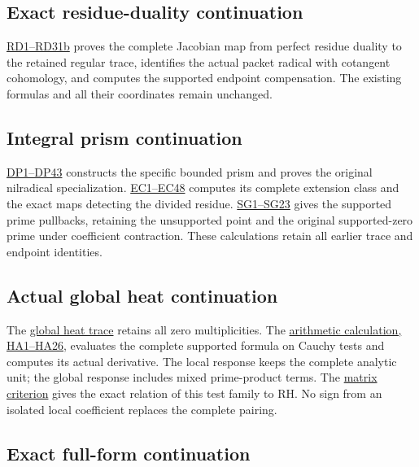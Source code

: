 \documentclass[
  10pt,
  a4paper,
]{article}
\begin{document}
\subsection{Exact residue-duality
continuation}\label{exact-residue-duality-continuation}

\href{COLLISION_RESIDUE_DUALITY_DERIVATION.md}{RD1--RD31b} proves the
complete Jacobian map from perfect residue duality to the retained
regular trace, identifies the actual packet radical with cotangent
cohomology, and computes the supported endpoint compensation. The
existing formulas and all their coordinates remain unchanged.

\subsection{Integral prism
continuation}\label{integral-prism-continuation}

\href{DISTINGUISHED_COLLISION_PRISM_DERIVATION.md}{DP1--DP43} constructs
the specific bounded prism and proves the original nilradical
specialization.
\href{NILRADICAL_COTANGENT_EXTENSION_CLASS_DERIVATION.md}{EC1--EC48}
computes its complete extension class and the exact maps detecting the
divided residue.
\href{SUPPORTED_PRISM_SPECTRUM_DERIVATION.md}{SG1--SG23} gives the
supported prime pullbacks, retaining the unsupported point and the
original supported-zero prime under coefficient contraction. These
calculations retain all earlier trace and endpoint identities.

\subsection{Actual global heat
continuation}\label{actual-global-heat-continuation}

The \href{ACTUAL_HEAT_ZERO_DISTRIBUTION_VARIATION.md}{global heat trace}
retains all zero multiplicities. The
\href{HEAT_CAUCHY_ARITHMETIC_DERIVATION.md}{arithmetic calculation,
HA1--HA26}, evaluates the complete supported formula on Cauchy tests and
computes its actual derivative. The local response keeps the complete
analytic unit; the global response includes mixed prime-product terms.
The \href{CAUCHY_WEIL_POSITIVITY_CRITERION.md}{matrix criterion} gives
the exact relation of this test family to RH. No sign from an isolated
local coefficient replaces the complete pairing.

\subsection{Exact full-form
continuation}\label{exact-full-form-continuation}
\end{document}
